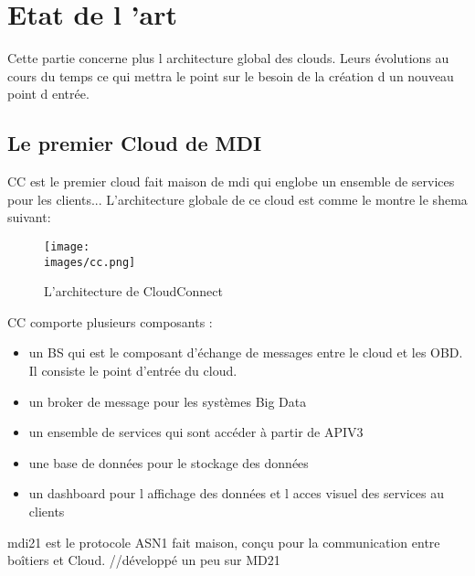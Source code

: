 \section{Etat de l 'art}
   Cette partie concerne plus l architecture global des clouds. Leurs évolutions 
   au cours du temps ce qui mettra le point sur le besoin de la création d un nouveau 
   point d entrée.   

    \subsection{Le premier Cloud de MDI}
        \gls{CC} est le premier cloud fait maison de \gls{mdi} qui englobe un ensemble 
        de services pour les clients... L'architecture globale de ce cloud est comme le montre 
        le shema suivant: 

        \begin{figure}[ht]
            \centering
            \texttt{[image: \\images/cc.png]}
            \caption{L'architecture de CloudConnect}
        \end{figure}

        \gls{CC} comporte plusieurs composants : 
        \begin{itemize}
            \renewcommand{\labelitemi}{$\bullet$}
            \item  un \gls{BS} qui est le composant d'échange de messages entre le cloud et 
            les OBD. Il consiste le point d'entrée du cloud.
            \item  un broker de message pour les systèmes Big Data
            \item  un ensemble de services qui sont accéder à partir de APIV3 
            \item une base de données pour le stockage des données 
            \item un dashboard pour l affichage des données et l acces visuel 
            des services au clients 
        \end{itemize}
        \vspace{0.2cm}

        \gls{mdi21} est le protocole  ASN1 fait maison, conçu pour la communication entre boîtiers et Cloud.
        //développé un peu sur MD21

       
    \break

